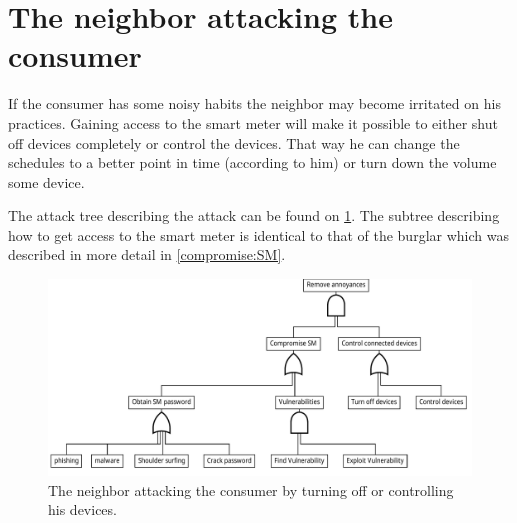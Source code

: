 \section{The neighbor attacking the consumer}

If the consumer has some noisy habits the neighbor may become irritated on his practices.
Gaining access to the smart meter will make it possible to either shut off devices completely or control the devices.
That way he can change the schedules to a better point in time (according to him) or turn down the volume some device.

The attack tree describing the attack can be found on \cref{fig:attack_trees:neighbor}.
The subtree describing how to get access to the smart meter is identical to that of the burglar which was described in more detail in \cref{compromise:SM}.

\begin{figure}[h]
  \centering
	\includegraphics[width=\textwidth]{figures/graphviz/neighbor_vs_consumer.pdf}
	\caption{The neighbor attacking the consumer by turning off or controlling his devices.}
	\label{fig:attack_trees:neighbor}
\end{figure}